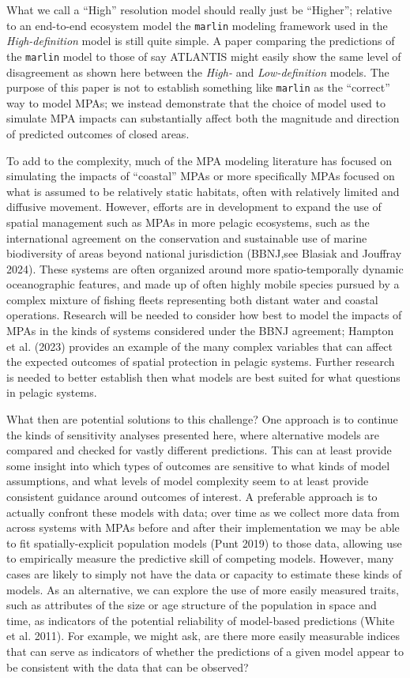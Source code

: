 \documentclass[
  default,
  lineno,
  referee]{sn-jnl}
\begin{document}
What we call a ``High'' resolution model should really just be
``Higher''; relative to an end-to-end ecosystem model the
\texttt{marlin} modeling framework used in the \emph{High-definition}
model is still quite simple. A paper comparing the predictions of the
\texttt{marlin} model to those of say ATLANTIS might easily show the
same level of disagreement as shown here between the \emph{High-} and
\emph{Low-definition} models. The purpose of this paper is not to
establish something like \texttt{marlin} as the ``correct'' way to model
MPAs; we instead demonstrate that the choice of model used to simulate
MPA impacts can substantially affect both the magnitude and direction of
predicted outcomes of closed areas.

To add to the complexity, much of the MPA modeling literature has
focused on simulating the impacts of ``coastal'' MPAs or more
specifically MPAs focused on what is assumed to be relatively static
habitats, often with relatively limited and diffusive movement. However,
efforts are in development to expand the use of spatial management such
as MPAs in more pelagic ecosystems, such as the international agreement
on the conservation and sustainable use of marine biodiversity of areas
beyond national jurisdiction (BBNJ,see Blasiak and Jouffray 2024). These
systems are often organized around more spatio-temporally dynamic
oceanographic features, and made up of often highly mobile species
pursued by a complex mixture of fishing fleets representing both distant
water and coastal operations. Research will be needed to consider how
best to model the impacts of MPAs in the kinds of systems considered
under the BBNJ agreement; Hampton et al. (2023) provides an example of
the many complex variables that can affect the expected outcomes of
spatial protection in pelagic systems. Further research is needed to
better establish then what models are best suited for what questions in
pelagic systems.

What then are potential solutions to this challenge? One approach is to
continue the kinds of sensitivity analyses presented here, where
alternative models are compared and checked for vastly different
predictions. This can at least provide some insight into which types of
outcomes are sensitive to what kinds of model assumptions, and what
levels of model complexity seem to at least provide consistent guidance
around outcomes of interest. A preferable approach is to actually
confront these models with data; over time as we collect more data from
across systems with MPAs before and after their implementation we may be
able to fit spatially-explicit population models (Punt 2019) to those
data, allowing use to empirically measure the predictive skill of
competing models. However, many cases are likely to simply not have the
data or capacity to estimate these kinds of models. As an alternative,
we can explore the use of more easily measured traits, such as
attributes of the size or age structure of the population in space and
time, as indicators of the potential reliability of model-based
predictions (White et al. 2011). For example, we might ask, are there
more easily measurable indices that can serve as indicators of whether
the predictions of a given model appear to be consistent with the data
that can be observed?
\end{document}
